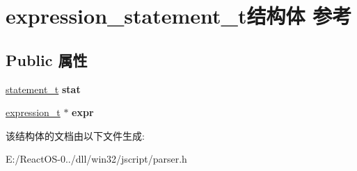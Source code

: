 \hypertarget{structexpression__statement__t}{}\section{expression\+\_\+statement\+\_\+t结构体 参考}
\label{structexpression__statement__t}
\subsection*{Public 属性}
\begin{DoxyCompactItemize}
\item 
\mbox{\label{structexpression__statement__t_a2f26a853f8f51d968a4d66f9bf6e79ee}} 
\hyperlink{struct__statement__t}{statement\+\_\+t} {\bfseries stat}
\item 
\mbox{\label{structexpression__statement__t_a1cf87d02542104b18f6cf88fc79258dc}} 
\hyperlink{struct__expression__t}{expression\+\_\+t} $\ast$ {\bfseries expr}
\end{DoxyCompactItemize}


该结构体的文档由以下文件生成\+:\begin{DoxyCompactItemize}
\item 
E\+:/\+React\+O\+S-\/0../dll/win32/jscript/parser.\+h\end{DoxyCompactItemize}
